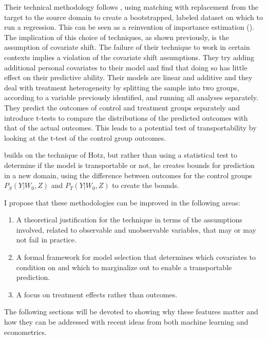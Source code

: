 \documentclass[a4paper,12pt]{article}
\begin{document}
Their technical methodology follows \cite{Abadie2006}, using matching with replacement from the target to the source domain to create a bootstrapped, labeled dataset on which to run a regression. This can be seen as a reinvention of importance estimation (\cite{Shimodaira2000, Suigyama2007}). The implication of this choice of techniques, as shown previously, is the assumption of covariate shift. The failure of their technique to work in certain contexts implies a violation of the covariate shift assumptions. They try adding additional personal covariates to their model and find that doing so has little effect on their predictive ability. Their models are linear and additive and they deal with treatment heterogeneity by splitting the sample into two groups, according to a variable previously identified, and running all analyses separately. They predict the outcomes of control and treatment groups separately and introduce t-tests to compare the distributions of the predicted outcomes with that of the actual outcomes. This leads to a potential test of transportability by looking at the t-test of the control group outcomes.

\cite{Gechter2015} builds on the technique of Hotz, but rather than using a statistical test to determine if the model is transportable or not, he creates bounds for prediction in a new domain, using the difference between outcomes for the control groups $P_S(Y|W_0, Z)$ and  $P_T(Y|W_0, Z)$ to create the bounds.

I propose that these methodologies can be improved in the following areas:

\begin{enumerate}
\item A theoretical justification for the technique in terms of the assumptions involved, related to observable and unobservable variables, that may or may not fail in practice.
\item A formal framework for model selection that determines which covariates to condition on and which to marginalize out to enable a transportable prediction.
\item A focus on treatment effects rather than outcomes.
\end{enumerate}

The following sections will be devoted to showing why these features matter and how they can be addressed with recent ideas from both machine learning and econometrics.

\end{document}
